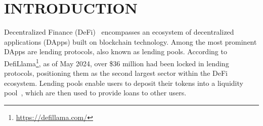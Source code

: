 \documentclass[runningheads]{llncs}
\begin{document}
\begin{abstract}

\end{abstract}
%
%
%

\section{INTRODUCTION}\label{section1}

Decentralized Finance (DeFi)~\cite{werner2022sok} encompasses an ecosystem of decentralized applications (DApps) built on blockchain technology. Among the most prominent DApps are lending protocols, also known as lending pools. According to DefiLlama\footnote{\href{https://defillama.com/}{https://defillama.com/}}, as of May 2024, over \$36 million  had been locked in lending protocols, positioning them as the second largest sector within the DeFi ecosystem. Lending pools enable users to deposit their tokens \cite{harvey2021defi} into a liquidity pool~\cite{sun2022liquidity}, which are then used to provide loans to other users. %

\end{document}
